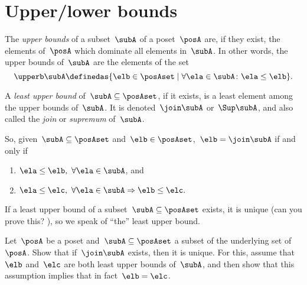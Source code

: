 \section{Upper/lower bounds}
\begin{ctdefinition}
    \label{def:least-upper-bound}
    The \emph{upper bounds} of a subset~$\subA$ of a poset~$\posA$ are, if they exist, the elements of~$\posA$ which dominate all elements in~$\subA$.
    In other words, the upper bounds of~$\subA$ are the elements of the set
    \begin{equation*}
        \upperb \subA\definedas \{ \elb \in \posAset \mid \forall \ela \in \subA  \colon \ela \leq \elb \}.
    \end{equation*}
\end{ctdefinition}

\begin{ctdefinition}
    A \emph{least upper bound} of~$\subA \subseteq \posAset$, if it exists, is a least element among the upper bounds of~$\subA$.
    It is denoted~$\join \subA$ or~$\Sup\subA$, and also called the \emph{join} or \emph{supremum} of~$\subA$.
\end{ctdefinition}

So, given~$\subA \subseteq \posAset$ and~$\elb \in \posAset$,~$\elb =  \join \subA$ if and only if
\begin{enumerate}
    \item $\ela \leq \elb, \ \forall \ela \in \subA$, and
    \item $\ela \leq \elc, \ \forall \ela \in \subA \Rightarrow \elb \leq \elc.
          $
\end{enumerate}

If a least upper bound of a subset~$\subA \subseteq \posAset$ exists, it is unique (can you prove this?
), so we speak of ``the'' least upper bound.

\begin{exercise}
    Let~$\posA$ be a poset and~$\subA \subseteq \posAset$ a subset of the underlying set of~$\posA$.
    Show that if~$\join \subA$ exists, then it is unique.
    For this, assume that~$\elb$ and~$\elc$ are both least upper bounds of~$\subA$, and then show that this assumption implies that in fact~$\elb = \elc$.
\end{exercise}
\begin{solution}
    \missingsolution
\end{solution}

